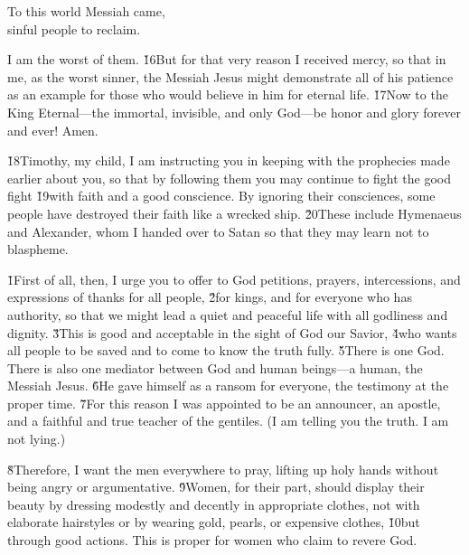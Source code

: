 \begin{poetry}
\poeml To this world Messiah came, \\
\poemll    sinful people to reclaim.
\end{poetry}

I am the worst of them. \v{16}But for that very reason I received mercy, so that in me, as the worst sinner, the Messiah Jesus might demonstrate all of his patience as an example for those who would believe in him for eternal life. \v{17}Now to the King Eternal---the immortal, invisible, and only God---be honor and glory forever and ever! Amen.

\v{18}Timothy, my child, I am instructing you in keeping with the prophecies made earlier about you, so that by following them you may continue to fight the good fight \v{19}with faith and a good conscience. By ignoring their consciences, some people have destroyed their faith like a wrecked ship. \v{20}These include Hymenaeus and Alexander, whom I handed over to Satan so that they may learn not to blaspheme.

\v{1}First of all, then, I urge you to offer to God petitions, prayers, intercessions, and expressions of thanks for all people, \v{2}for kings, and for everyone who has authority, so that we might lead a quiet and peaceful life with all godliness and dignity. \v{3}This is good and acceptable in the sight of God our Savior, \v{4}who wants all people to be saved and to come to know the truth fully. \v{5}There is one God. There is also one mediator between God and human beings---a human, the Messiah Jesus. \v{6}He gave himself as a ransom for everyone, the testimony at the proper time. \v{7}For this reason I was appointed to be an announcer, an apostle, and a faithful and true teacher of the gentiles. (I am telling you the truth. I am not lying.)

\v{8}Therefore, I want the men everywhere to pray, lifting up holy hands without being angry or argumentative. \v{9}Women, for their part, should display their beauty by dressing modestly and decently in appropriate clothes, not with elaborate hairstyles or by wearing gold, pearls, or expensive clothes, \v{10}but through good actions. This is proper for women who claim to revere God.

